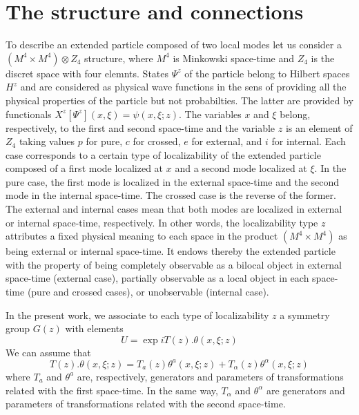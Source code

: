 \documentclass[12pt,a4paper]{article}
\begin{document}
\section{The structure and connections}

To describe an extended particle composed of two local modes let us consider a
$\left(  M^{4}\times M^{4}\right)  \otimes Z_{4}$ structure, where $M^{4}$ is
Minkowski space-time and $Z_{4}$ is the discret space with four elemnts.
States $\Psi^{z}$ of the particle belong to Hilbert spaces $H^{z}$ and are
considered as physical wave functions in the sens of providing all the
physical properties of the particle but not probabilties. The latter are
provided by functionals $X^{z}[\Psi^{z}]\left(  x,\xi\right)  =\psi\left(
x,\xi;z\right)  $.\cite{Destouches 1956} The variables $x$ and $\xi$ belong,
respectively, to the first and second space-time and the variable $z$ is an
element of $Z_{4}$ taking values $p$ for pure, $c$ for crossed, $e$ for
external, and $i$ for internal. Each case corresponds to a certain type of
localizability of the extended particle composed of a first mode localized at
$x$ and a second mode localized at $\xi$. In the pure case, the first mode is
localized in the external space-time and the second mode in the internal
space-time. The crossed case is the reverse of the former. The external and
internal cases mean that both modes are localized in external or internal
space-time, respectively. In other words, the localizability type $z$
attributes a fixed physical meaning to each space in the product $\left(
M^{4}\times M^{4}\right)  $ as being external or internal space-time. It
endows thereby the extended particle with the property of being completely
observable as a bilocal object in external space-time (external case),
partially observable as a local object in each space-time (pure and crossed
cases), or unobservable (internal case).

In the present work, we associate to each type of localizability $z$ a
symmetry group $G\left(  z\right)  $ with elements
\begin{equation}
U=\exp iT\left(  z\right)  .\theta\left(  x,\xi;z\right)
\end{equation}
We can assume that
\begin{equation}
T\left(  z\right)  .\theta\left(  x,\xi;z\right)  =T_{a}\left(  z\right)
\theta^{a}\left(  x,\xi;z\right)  +T_{\alpha}\left(  z\right)  \theta^{\alpha
}\left(  x,\xi;z\right)
\end{equation}
where $T_{a}$ and $\theta^{a}$ are, respectively, generators and parameters of
transformations related with the first space-time. In the same way,
$T_{\alpha}$ and $\theta^{\alpha}$ are generators and parameters of
transformations related with the second space-time.
\end{document}
